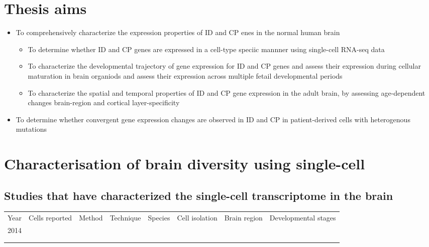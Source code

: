 \documentclass[12pt]{article}
\begin{document}
\section{Thesis aims}

\begin{itemize}
    \item To comprehensively characterize the expression properties of ID and CP enes in the normal human brain
    \begin{itemize}
        \item To determine whether ID and CP genes are expressed in a cell-type speciic mannner using single-cell RNA-seq data
        \item To characterize the developmental trajectory of gene expression for ID and CP genes and assess their expression during cellular maturation in brain organiods and assess their expression across multiple fetail developmental periods 
        \item  To characterize the spatial and temporal properties of ID and CP gene expression in the adult brain, by assessing age-dependent changes  brain-region and cortical layer-specificity 
        
    \end{itemize}

    \item To determine whether convergent gene expression changes are observed in ID and CP in patient-derived cells with heterogenous mutations 

\end{itemize}

\section{Characterisation of brain diversity using single-cell}
\subsection{Studies that have characterized the single-cell transcriptome in the brain}

\begin{table}[]
    \begin{tabular}{llllllll}
     Year & Cells reported  & Method  & Technique  & Species  &  Cell isolation & Brain region & Developmental stages\\
     2014 &  &  &  & & & & \\
     &  &  &  & &&& \\
     &  &  &  & &&&
    \end{tabular}
    \end{table}
\end{document}
